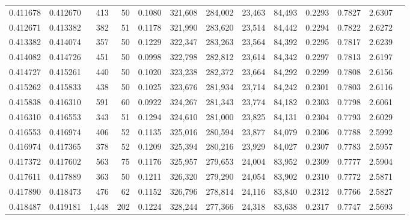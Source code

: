 \begin{tabular}{rrrrrrrrrrrrr}
0.411678 & 0.412670 &   413 &  50 &                                     0.1080 & 321,608 & 284,002 &  23,463 &  84,493 & 0.2293 & 0.7827 & 2.6307 \\
0.412671 & 0.413382 &   382 &  51 &                                     0.1178 & 321,990 & 283,620 &  23,514 &  84,442 & 0.2294 & 0.7822 & 2.6272 \\
0.413382 & 0.414074 &   357 &  50 &                                     0.1229 & 322,347 & 283,263 &  23,564 &  84,392 & 0.2295 & 0.7817 & 2.6239 \\
0.414082 & 0.414726 &   451 &  50 &                                     0.0998 & 322,798 & 282,812 &  23,614 &  84,342 & 0.2297 & 0.7813 & 2.6197 \\
0.414727 & 0.415261 &   440 &  50 &                                     0.1020 & 323,238 & 282,372 &  23,664 &  84,292 & 0.2299 & 0.7808 & 2.6156 \\
0.415262 & 0.415833 &   438 &  50 &                                     0.1025 & 323,676 & 281,934 &  23,714 &  84,242 & 0.2301 & 0.7803 & 2.6116 \\
0.415838 & 0.416310 &   591 &  60 &                                     0.0922 & 324,267 & 281,343 &  23,774 &  84,182 & 0.2303 & 0.7798 & 2.6061 \\
0.416310 & 0.416553 &   343 &  51 &                                     0.1294 & 324,610 & 281,000 &  23,825 &  84,131 & 0.2304 & 0.7793 & 2.6029 \\
0.416553 & 0.416974 &   406 &  52 &                                     0.1135 & 325,016 & 280,594 &  23,877 &  84,079 & 0.2306 & 0.7788 & 2.5992 \\
0.416974 & 0.417365 &   378 &  52 &                                     0.1209 & 325,394 & 280,216 &  23,929 &  84,027 & 0.2307 & 0.7783 & 2.5957 \\
0.417372 & 0.417602 &   563 &  75 &                                     0.1176 & 325,957 & 279,653 &  24,004 &  83,952 & 0.2309 & 0.7777 & 2.5904 \\
0.417611 & 0.417889 &   363 &  50 &                                     0.1211 & 326,320 & 279,290 &  24,054 &  83,902 & 0.2310 & 0.7772 & 2.5871 \\
0.417890 & 0.418473 &   476 &  62 &                                     0.1152 & 326,796 & 278,814 &  24,116 &  83,840 & 0.2312 & 0.7766 & 2.5827 \\
0.418487 & 0.419181 & 1,448 & 202 &                                     0.1224 & 328,244 & 277,366 &  24,318 &  83,638 & 0.2317 & 0.7747 & 2.5693 \\

\end{tabular}
